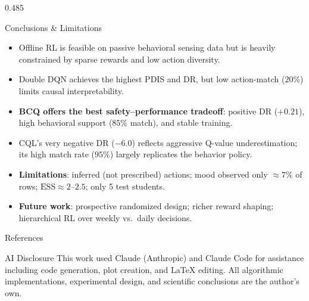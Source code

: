 \documentclass[final]{beamer}
\begin{document}
\begin{frame}[t]{}
\begin{columns}[T]
\begin{column}{0.485\linewidth}
\begin{block}{Conclusions \& Limitations}
\begin{itemize}
  \item Offline RL is feasible on passive behavioral sensing data but is
        heavily constrained by sparse rewards and low action diversity.
  \item Double DQN achieves the highest PDIS and DR, but low action-match ($20\%$)
        limits causal interpretability.
  \item \textbf{BCQ offers the best safety--performance tradeoff}: positive DR
        ($+0.21$), high behavioral support ($85\%$ match), and stable training.
  \item CQL's very negative DR ($-6.0$) reflects aggressive Q-value underestimation;
        its high match rate ($95\%$) largely replicates the behavior policy.
  \item \textbf{Limitations}: inferred (not prescribed) actions; mood observed
        only $\approx 7\%$ of rows; $\text{ESS}\approx2$--$2.5$; only 5 test
        students.
  \item \textbf{Future work}: prospective randomized design; richer reward
        shaping; hierarchical RL over weekly vs.\ daily decisions.
\end{itemize}
\end{block}

\begin{block}{References}
\footnotesize


\end{block}

\begin{block}{\small AI Disclosure}
\footnotesize
This work used Claude (Anthropic) and Claude Code for assistance including
code generation, plot creation, and \LaTeX{} editing.  All algorithmic
implementations, experimental design, and scientific conclusions are
the author's own.
\end{block}

\end{column}
\end{columns}

\end{frame}
\end{document}
